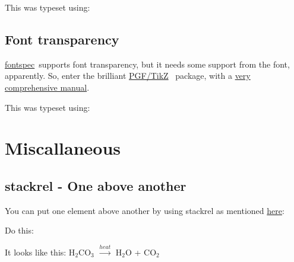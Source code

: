\documentclass[a4paper,extrafontsizes,12pt,twoside,openany]{memoir}
\newcommand{\showpart}[1]{\noindent}
\newcommand{\FontSpec}{\href{http://tug.ctan.org/cgi-bin/ctanPackageInformation.py?id=fontspec}{fontspec}\ }
\newcommand{\TikZ}{\href{http://www.texample.net/tikz/examples/}{PGF/TikZ}\ }
\newcommand{\red}[1]{{\color{red}{#1}}}
\newcommand{\green}[1]{{\color{green}{#1}}}
\newcommand{\blue}[1]{{\color{blue}{#1}}}
\begin{document}
This was typeset using: \showpart{DROPCAP}

\section{Font transparency}


\FontSpec supports font transparency, but it needs some support from the font, apparently. So, enter the brilliant \TikZ
package, with a \href{http://www.ctan.org/tex-archive/graphics/pgf/base/doc/generic/pgf/pgfmanual.pdf}{very
comprehensive manual}.

This was typeset using: \showpart{FONTTRANSPARENCY}

\chapter{Miscallaneous}

\section{stackrel - One above another}

You can put one element above another by using stackrel as mentioned
\href{http://www.uz.ac.zw/science/maths/latex/stackrel.html}{here}:

Do this: \showpart{STACKREL}

It looks like this:
H$_2$CO$_3$ $\stackrel{heat}{\longrightarrow}$ H$_2$O + CO$_2$
\end{document}
